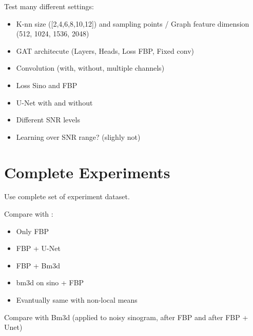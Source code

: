 Test many different settings:
\begin{itemize}
  \item K-nn size ([2,4,6,8,10,12]) and sampling points / Graph feature dimension (512, 1024, 1536, 2048)
 
  \item GAT architecute (Layers, Heads, Loss FBP, Fixed conv)
  \item Convolution (with, without, multiple channels)
  \item Loss Sino and FBP
  \item U-Net with and without
  \item Different SNR levels
  \item Learning over SNR range? (slighly not)
  
  
\end{itemize}


\section{Complete Experiments}
Use complete set of experiment dataset.

Compare with :
\begin{itemize}
  \item Only FBP
  \item FBP  + U-Net
  \item FBP  + Bm3d
  \item bm3d on sino + FBP
  \item Evantually same with non-local means
\end{itemize}
Compare with Bm3d (applied to noisy sinogram, after FBP and after FBP + Unet)

